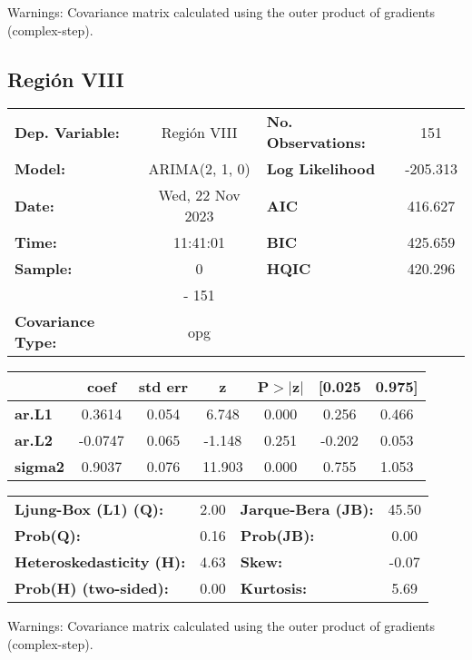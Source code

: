 \documentclass{article}%
\begin{document}
Warnings: \newline
 [1] Covariance matrix calculated using the outer product of gradients (complex-step).%
\subsection*{Región VIII}%
\begin{center}
\begin{tabular}{lclc}
\toprule
\textbf{Dep. Variable:}          &   Región VIII    & \textbf{  No. Observations:  } &    151      \\
\textbf{Model:}                  &  ARIMA(2, 1, 0)  & \textbf{  Log Likelihood     } &  -205.313   \\
\textbf{Date:}                   & Wed, 22 Nov 2023 & \textbf{  AIC                } &  416.627    \\
\textbf{Time:}                   &     11:41:01     & \textbf{  BIC                } &  425.659    \\
\textbf{Sample:}                 &        0         & \textbf{  HQIC               } &  420.296    \\
\textbf{}                        &       - 151      & \textbf{                     } &             \\
\textbf{Covariance Type:}        &       opg        & \textbf{                     } &             \\
\bottomrule
\end{tabular}
\begin{tabular}{lcccccc}
                & \textbf{coef} & \textbf{std err} & \textbf{z} & \textbf{P$> |$z$|$} & \textbf{[0.025} & \textbf{0.975]}  \\
\midrule
\textbf{ar.L1}  &       0.3614  &        0.054     &     6.748  &         0.000        &        0.256    &        0.466     \\
\textbf{ar.L2}  &      -0.0747  &        0.065     &    -1.148  &         0.251        &       -0.202    &        0.053     \\
\textbf{sigma2} &       0.9037  &        0.076     &    11.903  &         0.000        &        0.755    &        1.053     \\
\bottomrule
\end{tabular}
\begin{tabular}{lclc}
\textbf{Ljung-Box (L1) (Q):}     & 2.00 & \textbf{  Jarque-Bera (JB):  } & 45.50  \\
\textbf{Prob(Q):}                & 0.16 & \textbf{  Prob(JB):          } &  0.00  \\
\textbf{Heteroskedasticity (H):} & 4.63 & \textbf{  Skew:              } & -0.07  \\
\textbf{Prob(H) (two-sided):}    & 0.00 & \textbf{  Kurtosis:          } &  5.69  \\
\bottomrule
\end{tabular}
\end{center}

Warnings: \newline
 [1] Covariance matrix calculated using the outer product of gradients (complex-step).

%
\end{document}

